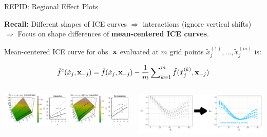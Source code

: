 \documentclass[10pt,compress,t,notes=noshow, xcolor=table]{beamer}
\begin{document}



\begin{frame}{REPID: Regional Effect Plots }

\textbf{Recall:} Different shapes of ICE curves $\Rightarrow$ interactions (ignore vertical shifts)\\
$\Rightarrow$ Focus on shape differences of {\color{cice}\bfseries mean-centered ICE curves}.
    

Mean-centered ICE curve for obs. $\mathbf{x}$ evaluated at $m$ grid points $\tilde x_j^{(1)}, \dots, \tilde x_j^{(m)}$ is:

{\color{cice}
$$\hat f^c(\tilde x_j, \mathbf{x}_{-j}) = \hat{f}(\tilde x_j, \mathbf{x}_{-j}) - \frac{1}{m} \sum\nolimits_{k=1}^m \hat{f}(\tilde x_j^{(k)}, \mathbf{x}_{-j})$$}

\begin{columns}
    \begin{column}{0.39\textwidth}
        \includegraphics[width = \textwidth, trim={13cm 0cm 0cm 0cm}, clip]{figure/interaction_separable_2}
    \end{column}
    \begin{column}{0.61\textwidth}
        \includegraphics[width = \textwidth]{figure/ice_rep_distance0.png} 
    \end{column}
\end{columns}

\end{frame}
\end{document}
